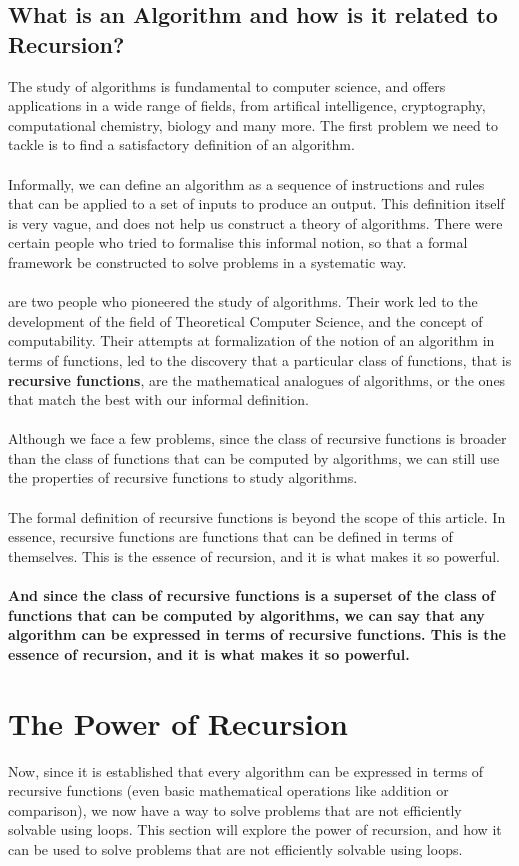 \documentclass[openany]{book}
\begin{document}
\subsection{What is an Algorithm and how is it related to Recursion?}
The study of algorithms is fundamental to computer science, and offers applications in a wide range of fields, from artifical intelligence, cryptography, computational chemistry, biology and many more. The first problem we need to tackle is to find a satisfactory definition of an algorithm. \\ \\
Informally, we can define an algorithm as a sequence of instructions and rules that can be applied to a set of inputs to produce an output. This definition itself is very vague, and does not help us construct a theory of algorithms. There were certain people who tried to formalise this informal notion, so that a formal framework be constructed to solve problems in a systematic way. \\ \\
 are two people who pioneered the study of algorithms. Their work led to the development of the field of Theoretical Computer Science, and the concept of computability. Their attempts at formalization of the notion of an algorithm in terms of functions, led to the discovery that a particular class of functions, that is \textbf{recursive functions}, are the mathematical analogues of algorithms, or the ones that match the best with our informal definition. \\ \\
Although we face a few problems, since the class of recursive functions is broader than the class of functions that can be computed by algorithms, we can still use the properties of recursive functions to study algorithms. \\ \\
The formal definition of recursive functions is beyond the scope of this article. In essence, recursive functions are functions that can be defined in terms of themselves. This is the essence of recursion, and it is what makes it so powerful. \\ \\
\textbf{And since the class of recursive functions is a superset of the class of functions that can be computed by algorithms, we can say that any algorithm can be expressed in terms of recursive functions. This is the essence of recursion, and it is what makes it so powerful.} 
\section{The Power of Recursion}
Now, since it is established that every algorithm can be expressed in terms of recursive functions (even basic mathematical operations like addition or comparison), we now have a way to solve problems that are not efficiently solvable using loops. This section will explore the power of recursion, and how it can be used to solve problems that are not efficiently solvable using loops. 
\end{document}
